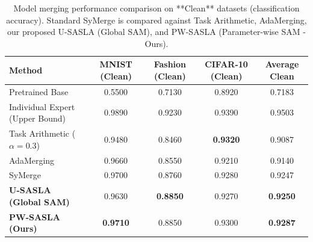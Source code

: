 \documentclass{article}
\theoremstyle{plain}
\theoremstyle{definition}
\theoremstyle{remark}
\begin{document}
\begin{table}[t]
\caption{Model merging performance comparison on **Clean** datasets (classification accuracy). Standard SyMerge is compared against Task Arithmetic, AdaMerging, our proposed U-SASLA (Global SAM), and PW-SASLA (Parameter-wise SAM - Ours).}
\label{tab:clean_results}
\vskip 0.15in
\begin{center}
\begin{small}
\begin{sc}
\begin{tabular}{lcccc}
\toprule
Method & MNIST (Clean) & Fashion (Clean) & CIFAR-10 (Clean) & Average Clean \\
\midrule
Pretrained Base & 0.5500 & 0.7130 & 0.8920 & 0.7183 \\
Individual Expert (Upper Bound) & 0.9890 & 0.9230 & 0.9390 & 0.9503 \\
\midrule
Task Arithmetic ($\alpha=0.3$) & 0.9480 & 0.8460 & \textbf{0.9320} & 0.9087 \\
AdaMerging & 0.9660 & 0.8550 & 0.9210 & 0.9140 \\
SyMerge & 0.9700 & 0.8760 & 0.9280 & 0.9247 \\
\textbf{U-SASLA (Global SAM)} & 0.9630 & \textbf{0.8850} & 0.9270 & \textbf{0.9250} \\
\textbf{PW-SASLA (Ours)} & \textbf{0.9710} & 0.8850 & 0.9300 & \textbf{0.9287} \\
\bottomrule
\end{tabular}
\end{sc}
\end{small}
\end{center}
\vskip -0.1in
\end{table}
\end{document}
